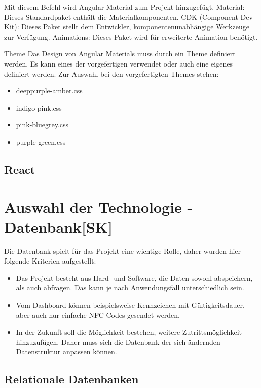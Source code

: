Mit diesem Befehl wird Angular Material zum Projekt hinzugefügt.
Material: Dieses Standardpaket enthält die Materialkomponenten.
CDK (Component Dev Kit): Dieses Paket stellt dem Entwickler, komponentenunabhängige Werkzeuge zur Verfügung.
Animations:  Dieses Paket wird für erweiterte Animation benötigt.

Theme
Das Design von Angular Materials muss durch ein Theme definiert werden. Es kann eines der vorgefertigen verwendet oder auch eine eigenes definiert werden. Zur Auswahl bei den vorgefertigten Themes stehen:

\begin{itemize}
  \item deeppurple-amber.css
  \item indigo-pink.css
  \item pink-bluegrey.css
  \item purple-green.css
\end{itemize}
\cite{AngularMaterials}


\subsection{React}

\section{Auswahl der Technologie - Datenbank[SK]}
Die Datenbank spielt für das Projekt eine wichtige Rolle, daher wurden hier folgende Kriterien aufgestellt:

\begin{itemize}
  \item Das Projekt besteht aus Hard- und Software, die Daten sowohl abspeichern, als auch abfragen. Das kann je nach Anwendungsfall unterschiedlich sein.
  \item Vom Dashboard können beispielsweise Kennzeichen mit Gültigkeitsdauer, aber auch nur einfache NFC-Codes gesendet werden.
  \item In der Zukunft soll die Möglichkeit bestehen, weitere Zutrittsmöglichkeit hinzuzufügen. Daher muss sich die Datenbank der sich ändernden Datenstruktur anpassen können.
\end{itemize}

\subsection{Relationale Datenbanken}

